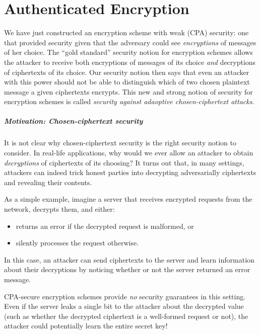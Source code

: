 \chapter{Authenticated Encryption}

We have just constructed an encryption scheme with
weak (CPA) security: one that provided security
given that the adversary could see
\emph{encryptions} of messages of her choice.
The ``gold standard'' security notion for encryption
schemes allows the attacker to receive both encryptions
of messages of its choice 
\emph{and} decryptions of ciphertexts of its choice.
Our security notion then says that 
even an attacker with this power should not be
able to distinguish which of two chosen plaintext
message a given ciphertexts encrypts.
This new and strong notion of security for encryption
schemes is called 
\emph{security against adaoptive chosen-ciphertext attacks}.

\paragraph{Motivation: Chosen-ciphertext security}
It is not clear why chosen-ciphertext security is the right 
security notion to consider. 
In real-life applications, why would we ever allow an attacker
to obtain \emph{decryptions} of ciphertexts of its choosing?
It turns out that, in many settings, attackers can indeed
trick honest parties into decrypting adversarially ciphertexts
and revealing their contents.

As a simple example, imagine a server that receives encrypted
requests from the network, decrypts them, and either:
\begin{itemize}
  \item returns an error if the decrypted request is malformed, or
  \item silently processes the request otherwise.
\end{itemize}
In this case, an attacker can send ciphertexts to the server and
learn information about their decryptions by noticing whether or not
the server returned an error message.

CPA-secure encryption schemes provide \emph{no} security guarantees
in this setting. Even if the server leaks a single bit to the attacker 
about the
decrypted value (such as whether the decrypted ciphertext is a
well-formed request or not), the attacker could potentially learn 
the entire secret key!

